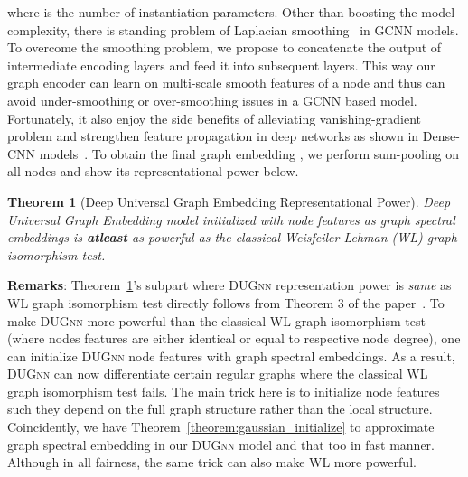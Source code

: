 \documentclass{article}
\newtheorem{theorem}{Theorem}
\begin{document}
\vspace{-2em}

\vspace{-2em}

where    is the number of instantiation parameters. Other than boosting the model complexity,  there is standing problem of Laplacian smoothing~\cite{li2018deeper} in GCNN models. To overcome the smoothing problem, we propose to concatenate the output of intermediate   encoding layers and feed it into subsequent layers. This way our graph encoder can learn on multi-scale smooth features of a node and thus can avoid under-smoothing or over-smoothing issues in a GCNN based model. Fortunately, it also enjoy the side benefits of   alleviating   vanishing-gradient problem and strengthen feature propagation in deep networks as shown in  Dense-CNN models~\cite{huang2017densely}. To obtain  the final graph embedding , we perform   sum-pooling on all nodes  and show its representational power below. 

\begin{theorem}[Deep Universal Graph Embedding Representational Power]\label{theorem:rep_power} 
	Deep Universal Graph Embedding model initialized with  node features as  graph spectral embeddings  is   \textbf{atleast} as powerful as the classical Weisfeiler-Lehman (WL) graph isomorphism test. \end{theorem}
\vspace{-0.5em}
\noindent\textbf{{Remarks}}: Theorem~\ref{theorem:rep_power}'s subpart where \textsc{DUGnn} representation power is \emph{same} as  WL graph isomorphism test  directly follows from  Theorem 3 of the paper~\cite{xu2018powerful}. To make \textsc{DUGnn} more powerful  than the classical WL graph isomorphism test (where nodes features are either  identical or equal to respective node degree), one   can initialize \textsc{DUGnn} node features with graph spectral embeddings. As a result,   \textsc{DUGnn} can now differentiate certain regular graphs where the classical  WL graph isomorphism test fails.  The main trick here is to initialize node features such they  depend on the full graph structure rather than the local structure.  Coincidently, we have Theorem~\ref{theorem:gaussian_initialize} to approximate graph spectral embedding in our \textsc{DUGnn} model and that too in fast manner. Although in all fairness, the same trick can also make   WL more powerful. 
\end{document}
